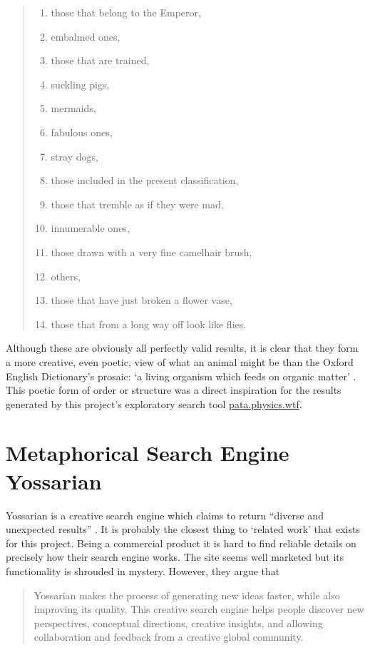\begin{quotation}
\begin{enumerate}
  \item those that belong to the Emperor,
  \item embalmed ones,
  \item those that are trained,
  \item suckling pigs,
  \item mermaids,
  \item fabulous ones,
  \item stray dogs,
  \item those included in the present classification,
  \item those that tremble as if they were mad,
  \item innumerable ones,
  \item those drawn with a very fine camelhair brush,
  \item others,
  \item those that have just broken a flower vase,
  \item those that from a long way off look like flies.
\end{enumerate}
\end{quotation}

Although these are obviously all perfectly valid results, it is clear that they form a more creative, even poetic, view of what an animal might be than the Oxford English Dictionary's prosaic: `a living organism which feeds on organic matter' \autocite*{OEDanimal}. This poetic form of order or structure was a direct inspiration for the results generated by this project's exploratory search tool \url{pata.physics.wtf}.


\section{Metaphorical Search Engine Yossarian}
\label{s:yossarian}

Yossarian is a creative search engine which claims to return ``diverse and unexpected results'' \autocite*{Yossarian2015}. It is probably the closest thing to `related work' that exists for this project. Being a commercial product it is hard to find reliable details on precisely how their search engine works. The site seems well marketed but its functionality is shrouded in mystery. However, they argue that

\begin{quotation}
  Yossarian makes the process of generating new ideas faster, while also improving its quality. This creative search engine helps people discover new perspectives, conceptual directions, creative insights, and allowing collaboration and feedback from a creative global community. 
\end{quotation}

